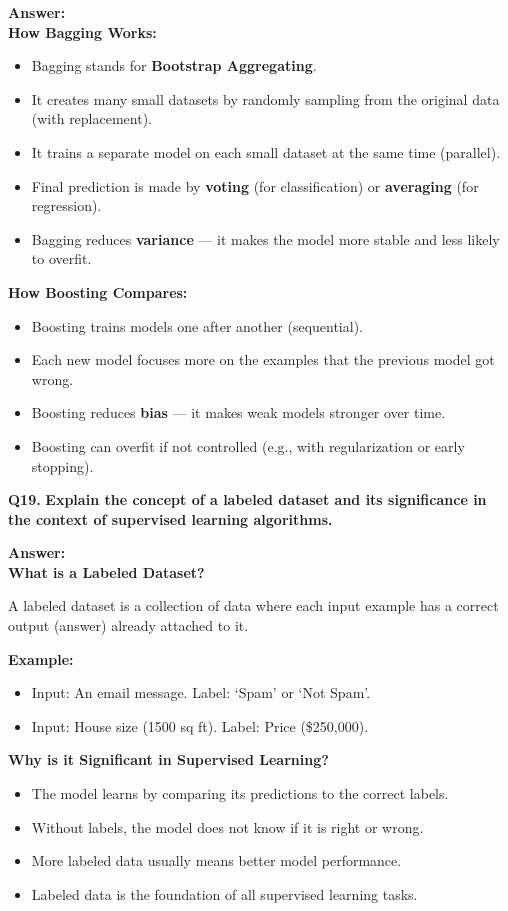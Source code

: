 \documentclass[12pt,a4paper]{article}
\newcommand{\question}[2]{%
    \begin{mdframed}[style=questionstyle]
        \textbf{\textcolor{headerblue}{Q#1.}} \textbf{#2}
    \end{mdframed}%
    \vspace{2pt}%
}
\newcommand{\ans}{\textbf{\textcolor{headerblue}{Answer:}}\\[4pt]}
\newcommand{\subhead}[1]{\textbf{\textcolor{headerblue}{#1}}}
\begin{document}
\ans

\subhead{How Bagging Works:}
\begin{itemize}[leftmargin=*]
    \item Bagging stands for \textbf{Bootstrap Aggregating}.
    \item It creates many small datasets by randomly sampling from the original data (with replacement).
    \item It trains a separate model on each small dataset at the same time (parallel).
    \item Final prediction is made by \textbf{voting} (for classification) or \textbf{averaging} (for regression).
    \item Bagging reduces \textbf{variance} --- it makes the model more stable and less likely to overfit.
\end{itemize}

\subhead{How Boosting Compares:}
\begin{itemize}[leftmargin=*]
    \item Boosting trains models one after another (sequential).
    \item Each new model focuses more on the examples that the previous model got wrong.
    \item Boosting reduces \textbf{bias} --- it makes weak models stronger over time.
    \item Boosting can overfit if not controlled (e.g., with regularization or early stopping).
\end{itemize}

\vspace{10pt}
\question{19}{Explain the concept of a labeled dataset and its significance in the context of supervised learning algorithms.}

\ans

\subhead{What is a Labeled Dataset?}

A labeled dataset is a collection of data where each input example has a correct output (answer) already attached to it.

\subhead{Example:}
\begin{itemize}[leftmargin=*]
    \item Input: An email message. \quad Label: `Spam' or `Not Spam'.
    \item Input: House size (1500 sq ft). \quad Label: Price (\$250,000).
\end{itemize}

\subhead{Why is it Significant in Supervised Learning?}
\begin{itemize}[leftmargin=*]
    \item The model learns by comparing its predictions to the correct labels.
    \item Without labels, the model does not know if it is right or wrong.
    \item More labeled data usually means better model performance.
    \item Labeled data is the foundation of all supervised learning tasks.
\end{itemize}
\end{document}
